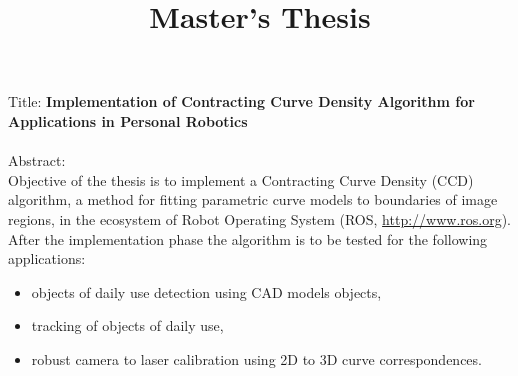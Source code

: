 \documentclass[11pt]{article}
\title{Master's Thesis}
\begin{document}
\maketitle

Title: 
\textbf{Implementation of Contracting Curve Density Algorithm for Applications in Personal Robotics}
\\
\\
Abstract:
\\
Objective of the thesis is to implement a Contracting Curve Density (CCD) algorithm, a method for fitting 
parametric curve models to boundaries of image regions, in the ecosystem of Robot Operating System 
(ROS, \href{http://www.ros.org}{http://www.ros.org}).
After the implementation phase the algorithm is to be tested for the following applications:
\begin{itemize}
\item objects of daily use detection using CAD models objects,
\item tracking of objects of daily use,
\item robust camera to laser calibration using 2D to 3D curve correspondences.
\end{itemize}
\end{document}
